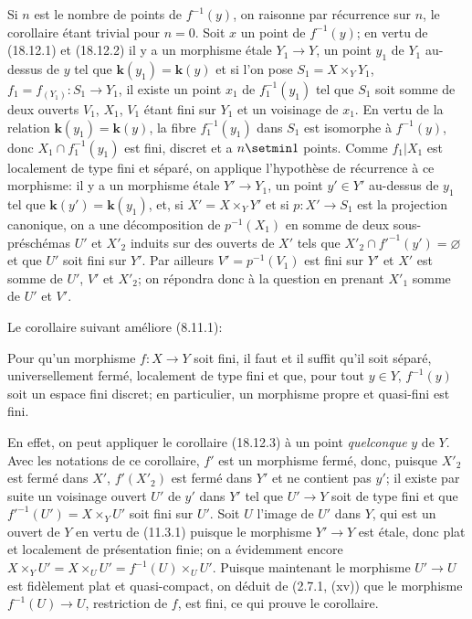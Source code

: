 Si $n$ est le nombre de points de $f^{-1}(y)$, on raisonne par récurrence sur $n$, le corollaire étant trivial pour $n=0$. Soit $x$ un point de $f^{-1}(y)$; en vertu de (18.12.1) et (18.12.2) il y a un morphisme étale $Y_1\to Y$, un point $y_1$ de $Y_1$ au-dessus de $y$ tel que $\boldsymbol{k}(y_1)=\boldsymbol{k}(y)$ et si l'on pose $S_1=X\times_Y Y_1$, $f_1=f_{(Y_1)}:S_1\to Y_1$, il existe un point $x_1$ de $f_1^{-1}(y_1)$
tel que $S_1$ soit somme de deux ouverts $V_1$, $X_1$, $V_1$ étant fini sur $Y_1$ et un voisinage de $x_1$. En vertu de la relation $\boldsymbol{k}(y_1)=\boldsymbol{k}(y)$, la fibre $f_1^{-1}(y_1)$ dans $S_1$ est isomorphe à $f^{-1}(y)$, donc $X_1\cap f_1^{-1}(y_1)$ est fini, discret et a $n\setmin 1$ points. Comme $f_1|X_1$ est localement de type fini et séparé, on applique l'hypothèse de récurrence à ce morphisme: il y a un morphisme étale $Y'\to Y_1$, un point $y'\in Y'$ au-dessus de $y_1$ tel que $\boldsymbol{k}(y')=\boldsymbol{k}(y_1)$, et, si $X'=X\times_Y Y'$ et si $p:X'\to S_1$ est la projection canonique, on a une décomposition de $p^{-1}(X_1)$ en somme de deux sous-préschémas $U'$ et $X'_2$ induits sur des ouverts de $X'$ tels que $X'_2\cap f'^{-1}(y')=\varnothing$ et que $U'$ soit fini sur $Y'$. Par ailleurs $V'=p^{-1}(V_1)$ est fini sur $Y'$ et $X'$ est somme de $U'$, $V'$ et $X'_2$; on répondra donc à la question en prenant $X'_1$ somme de $U'$ et $V'$.

Le corollaire suivant améliore (8.11.1):

\begin{corollary}[18.12.4]
\label{IV.18.12.4}
Pour qu'un morphisme $f:X\to Y$ soit fini, il faut et il suffit qu'il soit séparé, universellement fermé, localement de type fini et que, pour tout $y\in Y$, $f^{-1}(y)$ soit un espace fini discret; en particulier, un morphisme propre et quasi-fini est fini.
\end{corollary}

En effet, on peut appliquer le corollaire (18.12.3) à un point \emph{quelconque} $y$ de $Y$. Avec les notations de ce corollaire, $f'$ est un morphisme fermé, donc, puisque $X'_2$ est fermé dans $X'$, $f'(X'_2)$ est fermé dans $Y'$ et ne contient pas $y'$; il existe par suite un voisinage ouvert $U'$ de $y'$ dans $Y'$ tel que $U'\to Y$ soit de type fini et que $f'^{-1}(U')=X\times_Y U'$ soit fini sur $U'$. Soit $U$ l'image de $U'$ dans $Y$, qui est un ouvert de $Y$ en vertu de (11.3.1) puisque le morphisme $Y'\to Y$ est étale, donc plat et localement de présentation finie; on a évidemment encore $X\times_Y U'=X\times_U U'=f^{-1}(U)\times_U U'$. Puisque maintenant le morphisme $U'\to U$ est fidèlement plat et quasi-compact, on déduit de (2.7.1, (xv)) que le morphisme $f^{-1}(U)\to U$, restriction de $f$, est fini, ce qui prouve le corollaire.


